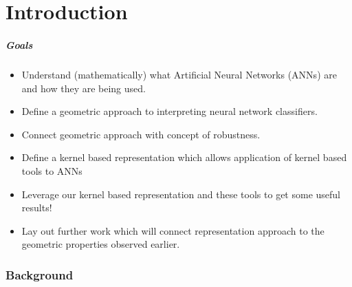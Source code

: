 \part{Introduction} %
\label{Chapter1} %




\begin{frame}
  \frametitle{Goals}
  \begin{itemize}
      \item<1-> Understand (mathematically) what Artificial Neural
        Networks (ANNs) are and how they are being used. 
      \item<2-> Define a geometric approach to interpreting neural
        network classifiers. 
      \item<3-> Connect geometric approach with concept of 
        robustness. 
      \item<4-> Define a kernel based representation which allows application
        of kernel based tools to ANNs
      \item<5-> Leverage our kernel based representation and these
        tools to get some useful results!
      \item<6-> Lay out further work which will connect representation
        approach to the geometric properties observed earlier. 
  \end{itemize}
\end{frame}

\section{Background}

